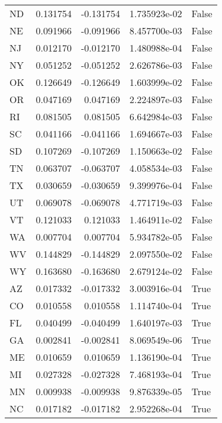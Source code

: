 \begin{table}
\begin{tabular}{lrrrl}
      ND &   0.131754 & -0.131754 &   1.735923e-02 &         False \\
      NE &   0.091966 & -0.091966 &   8.457700e-03 &         False \\
      NJ &   0.012170 & -0.012170 &   1.480988e-04 &         False \\
      NY &   0.051252 & -0.051252 &   2.626786e-03 &         False \\
      OK &   0.126649 & -0.126649 &   1.603999e-02 &         False \\
      OR &   0.047169 &  0.047169 &   2.224897e-03 &         False \\
      RI &   0.081505 &  0.081505 &   6.642984e-03 &         False \\
      SC &   0.041166 & -0.041166 &   1.694667e-03 &         False \\
      SD &   0.107269 & -0.107269 &   1.150663e-02 &         False \\
      TN &   0.063707 & -0.063707 &   4.058534e-03 &         False \\
      TX &   0.030659 & -0.030659 &   9.399976e-04 &         False \\
      UT &   0.069078 & -0.069078 &   4.771719e-03 &         False \\
      VT &   0.121033 &  0.121033 &   1.464911e-02 &         False \\
      WA &   0.007704 &  0.007704 &   5.934782e-05 &         False \\
      WV &   0.144829 & -0.144829 &   2.097550e-02 &         False \\
      WY &   0.163680 & -0.163680 &   2.679124e-02 &         False \\
      AZ &   0.017332 & -0.017332 &   3.003916e-04 &          True \\
      CO &   0.010558 &  0.010558 &   1.114740e-04 &          True \\
      FL &   0.040499 & -0.040499 &   1.640197e-03 &          True \\
      GA &   0.002841 & -0.002841 &   8.069549e-06 &          True \\
      ME &   0.010659 &  0.010659 &   1.136190e-04 &          True \\
      MI &   0.027328 & -0.027328 &   7.468193e-04 &          True \\
      MN &   0.009938 & -0.009938 &   9.876339e-05 &          True \\
      NC &   0.017182 & -0.017182 &   2.952268e-04 &          True \\

\end{tabular}
\end{table}
